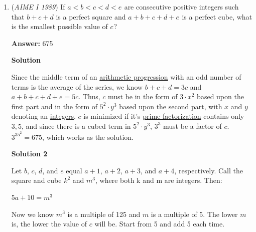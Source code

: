 \begin{enumerate}
 



\textbf{Solution 5}

Write out these equations:

 
$\frac{n}{810} = \frac{d25}{999}$
$\frac{n}{30} = \frac{d25}{37}$
$37n = 30(d25)$

 
Thus $n$ divides 25 and 30. The only solution for this under 1000 is $\boxed{750}$.

 
-jackshi2006

 Note: We know $n < 810$ since $\frac{n}{810} < 1,$ so it suffices to check for numbers under $810$ not $1000.$



	\item (\textit{AIME I 1989}) If $a<b<c<d<e^{}_{}$ are consecutive positive integers such that $b+c+d$ is a perfect square and $a+b+c+d+e^{}_{}$ is a perfect cube, what is the smallest possible value of $c^{}_{}$?


 
 \textbf{Answer: }675



\textbf{Solution}

Since the middle term of an \href{https://artofproblemsolving.com/wiki/index.php?title=Arithmetic\_progression}{arithmetic progression} with an odd number of terms is the average of the series, we know $b + c + d = 3c$ and $a + b + c + d + e = 5c$. Thus, $c$ must be in the form of $3 \cdot x^2$ based upon the first part and in the form of $5^2 \cdot y^3$ based upon the second part, with $x$ and $y$ denoting an \href{https://artofproblemsolving.com/wiki/index.php?title=Integer}{integers}. $c$ is minimized if it’s \href{https://artofproblemsolving.com/wiki/index.php?title=Prime\_factorization}{prime factorization} contains only $3,5$, and since there is a cubed term in $5^2 \cdot y^3$, $3^3$ must be a factor of $c$. $3^35^2 = \boxed{675}$, which works as the solution.

 



\textbf{Solution 2}

Let $b$, $c$, $d$, and $e$ equal $a+1$, $a+2$, $a+3$, and $a+4$, respectively. Call the square and cube $k^2$ and $m^3$, where both k and m are integers. Then:

 $5a + 10 = m^3$

 Now we know $m^3$ is a multiple of 125 and $m$ is a multiple of 5. The lower $m$ is, the lower the value of $c$ will be. Start from 5 and add 5 each time.


\end{enumerate}
